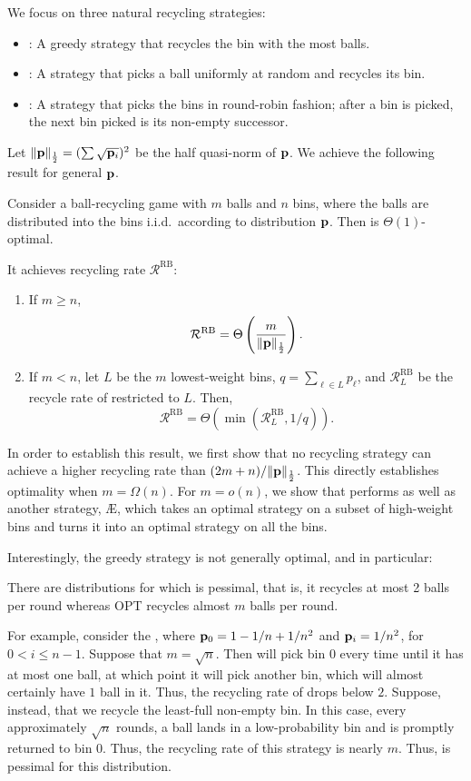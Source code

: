 We focus on three natural recycling strategies:
\begin{itemize}
\item \FB: A greedy strategy that recycles the bin with the most balls.
\item \RB: A strategy that picks a ball uniformly at random and recycles its
	bin.
\item \GG: A strategy that picks the bins in round-robin fashion; after a bin
	is picked, the next bin picked is its non-empty successor.
\end{itemize}
Let $\|\mathbf{p}\|_{\frac{1}{2}} = (\sum \sqrt{\mathbf{p}_i})^2$  be the half quasi-norm of $\mathbf{p}$.  We
achieve the following result for general $\mathbf{p}$.

\begin{theorem}\label{thm:random-opt}
	Consider a ball-recycling game with $m$ balls and $n$ bins, where the balls
	are distributed into the bins i.i.d.\ according to distribution $\mathbf{p}$. Then
	\RB{} is $\Theta(1)$-optimal.

        It achieves recycling rate
	$\mathcal{R}^\textrm{RB}$:
	\begin{enumerate}
		\item If $m \geq n$,
			\[\mathcal{R}^\textrm{RB} = \Theta\left(\frac{m}{\|\mathbf{p}\|_{\frac{1}{2}}}\right).\]
		\item If $m < n$, let $L$ be the $m$ lowest-weight bins, $q = \sum_{\ell\in
			L} p_\ell$, and $\mathcal{R}_L^\textrm{RB}$ be the recycle rate of
			\RB restricted to $L$. Then,
			\[\mathcal{R}^\textrm{RB} =
			\Theta\left(\min\left(\mathcal{R}_L^\textrm{RB}, 1/q\right)\right).\]
	\end{enumerate}
\end{theorem}

In order to establish this result, we first show that no recycling strategy can
achieve a higher recycling rate than $(2m+n)/\|\mathbf{p}\|_{\frac{1}{2}}$.  This directly
establishes optimality when $m = \Omega(n)$. For $m=o(n)$, we show that \RB
performs as well as another strategy, \AE, which takes an optimal strategy on a
subset of high-weight bins and turns it into an optimal strategy on all the
bins.

Interestingly, the greedy strategy \FB is not generally optimal, and in
particular:
\begin{observation}
There are distributions for which \FB is pessimal, that is, it
recycles at most 2 balls per round whereas OPT recycles almost $m$
balls per round.
\end{observation}
For example, consider the , where $\mathbf{p}_0 =
1-1/n+1/n^2$ and $\mathbf{p}_i = 1/n^2$, for $0<i\leq n-1$.  Suppose that $m=\sqrt{n}$.
Then \FB will pick bin $0$ every time until it has at most one ball, at which
point it will pick another bin, which will almost certainly have $1$ ball in
it.  Thus, the recycling rate of \FB drops below $2$.  Suppose, instead, that
we recycle the least-full non-empty bin.  In this case, every approximately
$\sqrt{n}$ rounds, a ball lands in a low-probability bin and is promptly
returned to bin $0$. Thus, the recycling rate of this strategy is nearly $m$.
Thus, \FB is pessimal for this distribution.

